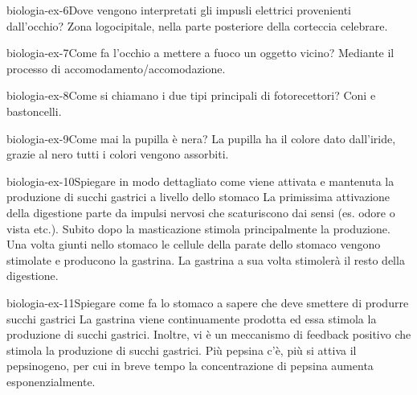 \documentclass[preview]{standalone}
\begin{document}
\begin{snippetexercise}{biologia-ex-6}{Dove vengono interpretati gli impusli elettrici provenienti dall'occhio?}
    Zona logocipitale, nella parte posteriore della corteccia celebrare.
\end{snippetexercise}

\begin{snippetexercise}{biologia-ex-7}{Come fa l'occhio a mettere a fuoco un oggetto vicino?}
    Mediante il processo di accomodamento/accomodazione.
\end{snippetexercise}

\begin{snippetexercise}{biologia-ex-8}{Come si chiamano i due tipi principali di fotorecettori?}
    Coni e bastoncelli.
\end{snippetexercise}

\begin{snippetexercise}{biologia-ex-9}{Come mai la pupilla è nera?}
    La pupilla ha il colore dato dall'iride,
    grazie al nero tutti i colori vengono assorbiti.
\end{snippetexercise}

\begin{snippetexercise}{biologia-ex-10}{Spiegare in modo dettagliato come viene attivata e mantenuta la produzione di succhi gastrici a
    livello dello stomaco}
    La primissima attivazione della digestione parte da impulsi nervosi che scaturiscono dai sensi
    (es. odore o vista etc.).
    Subito dopo la masticazione stimola principalmente la produzione.
    Una volta giunti nello stomaco le cellule della parate dello stomaco vengono stimolate e producono la gastrina.
    La gastrina a sua volta stimolerà il resto della digestione.
\end{snippetexercise}

\begin{snippetexercise}{biologia-ex-11}{Spiegare come fa lo stomaco a sapere che deve smettere di produrre succhi gastrici}
    La gastrina viene continuamente prodotta ed essa stimola la produzione di succhi gastrici.
    Inoltre, vi è un meccanismo di feedback positivo che stimola la produzione di succhi gastrici.
    Più pepsina c'è, più si attiva il pepsinogeno, per cui in breve tempo la concentrazione di pepsina aumenta esponenzialmente.
\end{snippetexercise}
\end{document}
